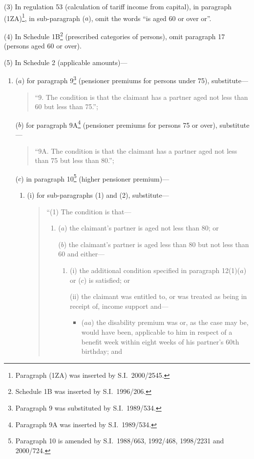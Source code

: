 \documentclass[12pt,a4paper]{article}
\begin{document}
(3) In regulation 53 (calculation of tariff income from capital), in paragraph (1ZA)\footnote{Paragraph (1ZA) was inserted by S.I.\ 2000/2545.}, in sub-paragraph ($a$), omit the words “is aged 60 or over or”.

(4) In Schedule 1B\footnote{Schedule 1B was inserted by S.I.\ 1996/206.} (prescribed categories of persons), omit paragraph 17 (persons aged 60 or over).

(5) In Schedule 2 (applicable amounts)—
\begin{enumerate}\item[]
($a$) for paragraph 9\footnote{Paragraph 9 was substituted by S.I.\ 1989/534.} (pensioner premiums for persons under 75), substitute—
\begin{quotation}
“9.  The condition is that the claimant has a partner aged not less than 60 but less than 75.”;
\end{quotation}

($b$) for paragraph 9A\footnote{Paragraph 9A was inserted by S.I.\ 1989/534.} (pensioner premiums for persons 75 or over), substitute—
\begin{quotation}
“9A.  The condition is that the claimant has a partner aged not less than 75 but less than 80.”;
\end{quotation}

($c$) in paragraph 10\footnote{Paragraph 10 is amended by S.I.\ 1988/663, 1992/468, 1998/2231 and 2000/724.} (higher pensioner premium)—
\begin{enumerate}\item[]
(i) for sub-paragraphs (1) and (2), substitute—
\begin{quotation}
“(1) The condition is that—
\begin{enumerate}\item[]
($a$) the claimant’s partner is aged not less than 80; or

($b$) the claimant’s partner is aged less than 80 but not less than 60 and either—
\begin{enumerate}\item[]
(i) the additional condition specified in paragraph 12(1)($a$)  or ($c$)  is satisfied; or

(ii) the claimant was entitled to, or was treated as being in receipt of, income support and—
\begin{itemize}\item[]
($aa$) the disability premium was or, as the case may be, would have been, applicable to him in respect of a benefit week within eight weeks of his partner’s 60th birthday; and


\end{itemize}
\end{enumerate}
\end{enumerate}
\end{quotation}
\end{enumerate}
\end{enumerate}
\end{document}
